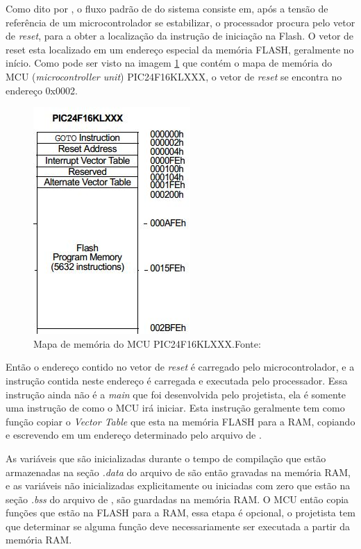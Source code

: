 Como dito por , o fluxo padrão de \boot do sistema consiste em, após a tensão de referência de um microcontrolador se estabilizar, o processador procura pelo vetor de \textit{reset}, para a obter a localização da instrução de iniciação na Flash. O vetor de reset esta localizado em um endereço especial da memória FLASH, geralmente no início. Como pode ser visto na imagem \ref{MAP_PIC24F16KLXXX} que contém o mapa de memória do MCU (\textit{microcontroller unit}) PIC24F16KLXXX, o vetor de \textit{reset} se encontra no endereço 0x0002.

\begin{figure}[H]
    \scriptsize
     \centering
     \includegraphics[scale=1]{dados/figuras/ResetVector.jpg}
     \caption{Mapa de memória do MCU PIC24F16KLXXX.\newline Fonte: \cite{Beningo2015}}
     \label{MAP_PIC24F16KLXXX}
\end{figure}

Então o endereço contido no vetor de \textit{reset} é carregado pelo microcontrolador, e a instrução contida neste endereço é carregada e executada pelo processador. Essa instrução ainda não é a \textit{main} que foi desenvolvida pelo projetista, ela é somente uma instrução de como o MCU irá iniciar. Esta instrução geralmente tem como função copiar o \textit{Vector Table} que esta na memória FLASH para a RAM, copiando e escrevendo em um endereço determinado pelo arquivo de \linker.

As variáveis que são inicializadas durante o tempo de compilação que estão armazenadas na seção \textit{.data} do arquivo de \linker são então gravadas na memória RAM, e as variáveis não inicializadas explicitamente ou iniciadas com zero que estão na seção \textit{.bss} do arquivo de \linker, são guardadas na memória RAM. O MCU então copia funções que estão na FLASH para a RAM, essa etapa é opcional, o projetista tem que determinar se alguma função deve necessariamente ser executada a partir da memória RAM. 

